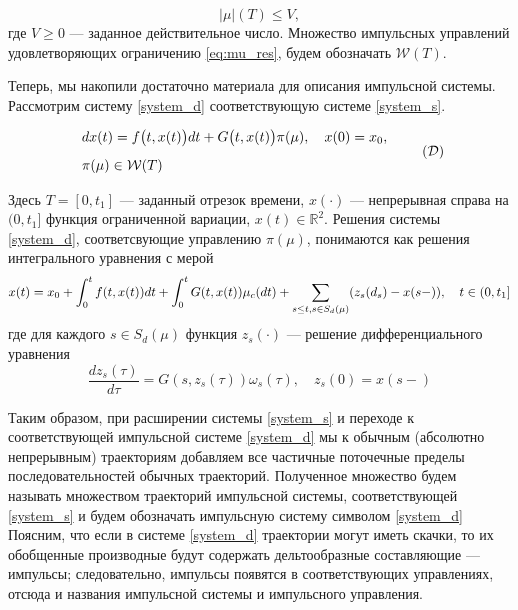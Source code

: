 \begin{equation}
  \label{eq:mu_res}
  |\mu|(T) \le V,
\end{equation}
где $V \ge 0$ --- заданное действительное число. Множество импульсных
управлений удовлетворяющих ограничению \eqref{eq:mu_res}, будем
обозначать $\mathcal{W}(T)$.


Теперь, мы накопили достаточно материала для описания импульсной
системы. Рассмотрим систему \eqref{system_d} соответствующую системе
\eqref{system_s}.

\begin{equation}
  \label{system_d}
  \begin{array}{l}
    dx(t)=f\big(t,x(t)\big)dt+G\big(t,x(t)\big)\pi(\mu), \quad
    x(0)=x_0, \\[8pt]
    \pi(\mu) \in \mathcal{W}(T)
  \end{array} \tag{$\mathcal{D}$}
\end{equation}

Здесь $T=[0,t_1]$ --- заданный отрезок времени, $x(\cdot)$ ---
непрерывная справа на $(0,t_1]$ функция ограниченной вариации, $x(t)
\in \mathbb{R}^2$. Решения системы \eqref{system_d}, соответсвующие
управлению $\pi(\mu)$, понимаются как решения интегрального уравнения
с мерой
\begin{equation*}
  x(t) = x_0 + \int_0^t f(t,x(t))dt + \int_0^t G(t,x(t)) \mu_c(dt) +
  \sum_{s \le t,\\s \in S_d(\mu)} (z_s(d_s) - x(s-)), \quad t \in (0,t_1]
\end{equation*}
где для каждого $s \in S_d(\mu)$ функция $z_s(\cdot)$ --- решение
дифференциального уравнения
\begin{equation*}
  \frac{dz_s(\tau)}{d\tau} = G(s,z_s(\tau))\omega_s(\tau), \quad z_s(0)=x(s-)
\end{equation*}

Таким образом, при расширении системы \eqref{system_s} и переходе к
соответствующей импульсной системе \eqref{system_d} мы к обычным
(абсолютно непрерывным) траекториям добавляем все частичные
поточечные пределы последовательностей обычных
траекторий. Полученное множество будем называть множеством
траекторий импульсной системы, соответствующей \eqref{system_s} и будем
обозначать импульсную систему символом \eqref{system_d} Поясним,
что если в системе \eqref{system_d} траектории могут иметь скачки,
то их обобщенные производные будут содержать дельтообразные
составляющие --- импульсы; следовательно, импульсы появятся в
соответствующих управлениях, отсюда и названия импульсной системы и
импульсного управления.

